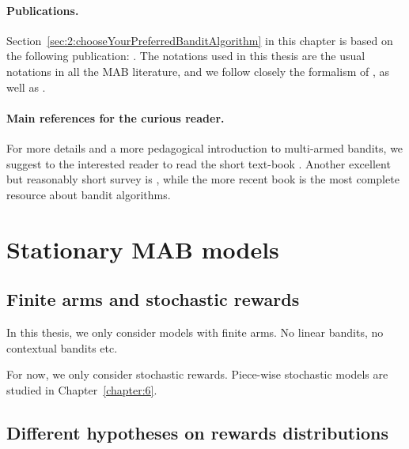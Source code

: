 \paragraph{Publications.}
%
Section~\ref{sec:2:chooseYourPreferredBanditAlgorithm} in this chapter is based on the following publication: \cite{Besson2018WCNC}.
The notations used in this thesis are the usual notations in all the MAB literature, and we follow closely the formalism of \cite{Kaufmann12PhD}, as well as \cite{Slivkins2019,LattimoreBanditAlgorithmsBook,Bubeck12}.


\paragraph{Main references for the curious reader.}
%
For more details and a more pedagogical introduction to multi-armed bandits, we suggest to the interested reader to read the short text-book \cite{Slivkins2019}.
Another excellent but reasonably short survey is \cite{Bubeck12}, while the more recent book \cite{LattimoreBanditAlgorithmsBook} is the most complete resource about bandit algorithms.


\newpage
\graphicspath{{2-Chapters/2-Chapter/Images/}}

\section{Stationary MAB models}
\label{sec:2:notations}

\subsection{Finite arms and stochastic rewards}

In this thesis, we only consider models with finite arms.
No linear bandits, no contextual bandits etc.


For now, we only consider stochastic rewards. Piece-wise stochastic models are studied in Chapter~\ref{chapter:6}.


\subsection{Different hypotheses on rewards distributions}

